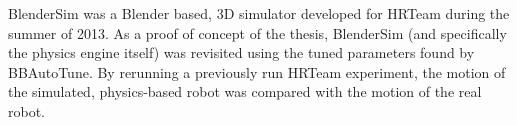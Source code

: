 BlenderSim was a Blender based, 3D simulator developed for HRTeam during the summer of 2013. As a proof of concept of the thesis, BlenderSim (and specifically the physics engine itself) was revisited using the tuned parameters found by BBAutoTune. By rerunning a previously run HRTeam experiment, the motion of the simulated, physics-based robot was compared with the motion of the real robot. 

